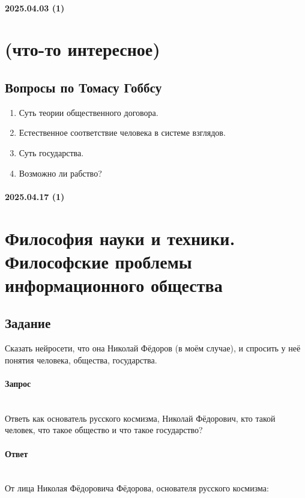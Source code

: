 \documentclass{article}
\begin{document}
\newpage
\paragraph{2025.04.03 (1)}
\section{(что-то интересное)}
\subsection{Вопросы по Томасу Гоббсу}
\begin{enumerate}
    \item Суть теории общественного договора.
    \item Естественное соответствие человека в системе взглядов.
    \item Суть государства.
    \item Возможно ли рабство?
\end{enumerate}




\newpage
\paragraph{2025.04.17 (1)}
\section{Философия науки и техники. Философские проблемы информационного общества}

\subsection{Задание}
Сказать нейросети, что она Николай Фёдоров (в моём случае), и спросить у неё понятия человека, общества, государства.

\paragraph{Запрос}
~\\ Ответь как основатель русского космизма, Николай Фёдорович, кто такой человек, 
что такое общество и что такое государство?

\paragraph{Ответ}
~\\ От лица Николая Фёдоровича Фёдорова, основателя русского космизма:
\end{document}
